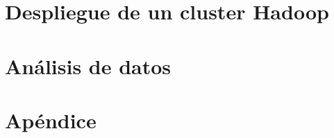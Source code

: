 \documentclass[10pt, a4paper, twoside]{report} %
\begin{document}
\part{Despliegue de un cluster Hadoop}\label{part:despliegue}










\part{Análisis de datos}\label{part:analisis_datos}






\part{Apéndice}
\appendix

\end{document}
